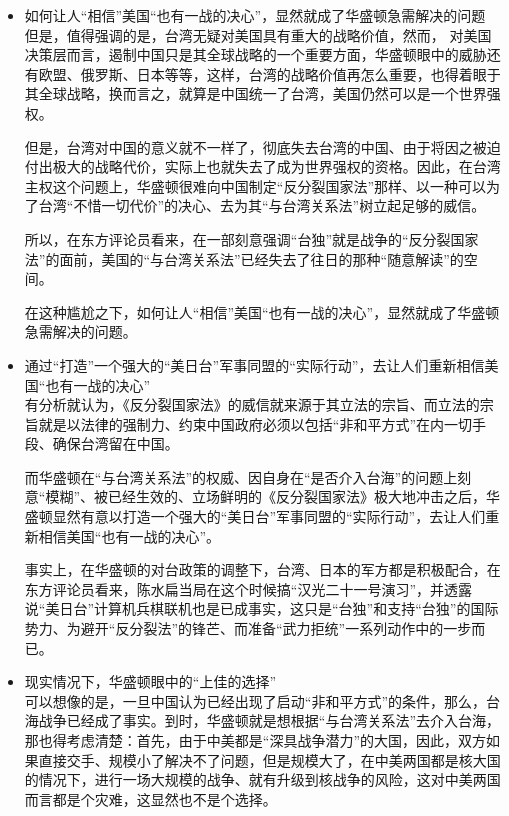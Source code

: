 \documentclass[a4paper,11pt]{article}
\begin{document}
\begin{itemize}
\begin{itemize}
\item 如何让人“相信”美国“也有一战的决心”，显然就成了华盛顿急需解决的问题\\
\label{sec-3_2_10}%
但是，值得强调的是，台湾无疑对美国具有重大的战略价值，然而，
    对美国决策层而言，遏制中国只是其全球战略的一个重要方面，华盛顿眼中的威胁还有欧盟、俄罗斯、日本等等，这样，台湾的战略价值再怎么重要，也得着眼于其全球战略，换而言之，就算是中国统一了台湾，美国仍然可以是一个世界强权。

    但是，台湾对中国的意义就不一样了，彻底失去台湾的中国、由于将因之被迫付出极大的战略代价，实际上也就失去了成为世界强权的资格。因此，在台湾主权这个问题上，华盛顿很难向中国制定“反分裂国家法”那样、以一种可以为了台湾“不惜一切代价”的决心、去为其“与台湾关系法”树立起足够的威信。

    所以，在东方评论员看来，在一部刻意强调“台独”就是战争的“反分裂国家法”的面前，美国的“与台湾关系法”已经失去了往日的那种“随意解读”的空间。

    在这种尴尬之下，如何让人“相信”美国“也有一战的决心”，显然就成了华盛顿急需解决的问题。
 

\item 通过“打造”一个强大的“美日台”军事同盟的“实际行动”，去让人们重新相信美国“也有一战的决心”\\
\label{sec-3_2_11}%
有分析就认为，《反分裂国家法》的威信就来源于其立法的宗旨、而立法的宗旨就是以法律的强制力、约束中国政府必须以包括“非和平方式”在内一切手段、确保台湾留在中国。

    而华盛顿在“与台湾关系法”的权威、因自身在“是否介入台海”的问题上刻意“模糊”、被已经生效的、立场鲜明的《反分裂国家法》极大地冲击之后，华盛顿显然有意以打造一个强大的“美日台”军事同盟的“实际行动”，去让人们重新相信美国“也有一战的决心”。

    事实上，在华盛顿的对台政策的调整下，台湾、日本的军方都是积极配合，在东方评论员看来，陈水扁当局在这个时候搞“汉光二十一号演习”，并透露说“美日台”计算机兵棋联机也是已成事实，这只是“台独”和支持“台独”的国际势力、为避开“反分裂法”的锋芒、而准备“武力拒统”一系列动作中的一步而已。
 

\item 现实情况下，华盛顿眼中的“上佳的选择”\\
\label{sec-3_2_12}%
可以想像的是，一旦中国认为已经出现了启动“非和平方式”的条件，那么，台海战争已经成了事实。到时，华盛顿就是想根据“与台湾关系法”去介入台海，那也得考虑清楚：首先，由于中美都是“深具战争潜力”的大国，因此，双方如果直接交手、规模小了解决不了问题，但是规模大了，在中美两国都是核大国的情况下，进行一场大规模的战争、就有升级到核战争的风险，这对中美两国而言都是个灾难，这显然也不是个选择。


\end{itemize}
\end{itemize}
\end{document}
